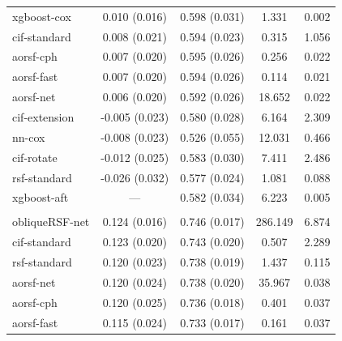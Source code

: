 \documentclass[twoside,11pt]{article}\usepackage[]{graphicx}\usepackage[]{xcolor}
\newenvironment{knitrout}{}{} %
\begin{document}
\begin{knitrout}
\begin{longtable}[t]{lcccc}
\hspace{1em}xgboost-cox & 0.010 (0.016) & 0.598 (0.031) & 1.331 & 0.002\\
\hspace{1em}cif-standard & 0.008 (0.021) & 0.594 (0.023) & 0.315 & 1.056\\
\hspace{1em}aorsf-cph & 0.007 (0.020) & 0.595 (0.026) & 0.256 & 0.022\\
\hspace{1em}aorsf-fast & 0.007 (0.020) & 0.594 (0.026) & 0.114 & 0.021\\
\hspace{1em}aorsf-net & 0.006 (0.020) & 0.592 (0.026) & 18.652 & 0.022\\
\hspace{1em}cif-extension & -0.005 (0.023) & 0.580 (0.028) & 6.164 & 2.309\\
\hspace{1em}nn-cox & -0.008 (0.023) & 0.526 (0.055) & 12.031 & 0.466\\
\hspace{1em}cif-rotate & -0.012 (0.025) & 0.583 (0.030) & 7.411 & 2.486\\
\hspace{1em}rsf-standard & -0.026 (0.032) & 0.577 (0.024) & 1.081 & 0.088\\
\hspace{1em}xgboost-aft & --- & 0.582 (0.034) & 6.223 & 0.005\\
\addlinespace[0.3em]
\multicolumn{5}{l}{\textit{\textbf{GBSG II; recurrence or death, n = 686, p = 10}}}\\
\hline
\hspace{1em}obliqueRSF-net & 0.124 (0.016) & 0.746 (0.017) & 286.149 & 6.874\\
\hspace{1em}cif-standard & 0.123 (0.020) & 0.743 (0.020) & 0.507 & 2.289\\
\hspace{1em}rsf-standard & 0.120 (0.023) & 0.738 (0.019) & 1.437 & 0.115\\
\hspace{1em}aorsf-net & 0.120 (0.024) & 0.738 (0.020) & 35.967 & 0.038\\
\hspace{1em}aorsf-cph & 0.120 (0.025) & 0.736 (0.018) & 0.401 & 0.037\\
\hspace{1em}aorsf-fast & 0.115 (0.024) & 0.733 (0.017) & 0.161 & 0.037\\

\end{longtable}
\end{knitrout}
\end{document}
